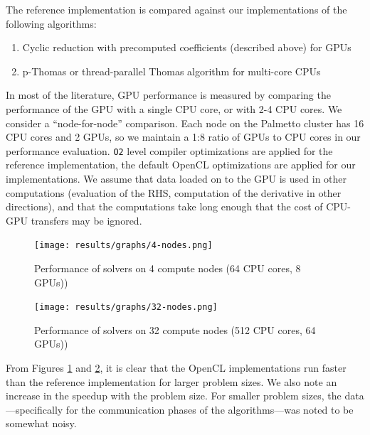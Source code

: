 \documentclass{article}
\begin{document}
    The reference implementation is compared against our implementations
    of the following algorithms:

    \begin{enumerate}
        \item Cyclic reduction with precomputed coefficients (described above)
            for GPUs
        \item p-Thomas or thread-parallel Thomas algorithm
            for multi-core CPUs
    \end{enumerate}

    In most of the literature, GPU performance is measured
    by comparing the performance of the GPU with
    a single CPU core, or with 2-4 CPU cores.
    We consider a ``node-for-node'' comparison.
    Each node on the Palmetto cluster has 16 CPU cores and 2 GPUs,
    so we maintain a 1:8 ratio of GPUs to CPU cores in our performance evaluation.
    \texttt{O2} level compiler optimizations are applied for the reference implementation,
    the default OpenCL optimizations are applied for our implementations.
    We assume that data loaded on to the GPU is used in other computations
    (evaluation of the RHS, computation of the derivative in other directions),
    and that the computations take long enough that
    the cost of CPU-GPU transfers may be ignored.

    \begin{figure}[h!]
    \begin{center}
    \texttt{[image: results/graphs/4-nodes.png]}
    \end{center}
    \caption{Performance of solvers on 4 compute nodes (64 CPU cores, 8 GPUs))}
    \label{fig:4-nodes}
    \end{figure}

    \begin{figure}[h!]
    \begin{center}
    \texttt{[image: results/graphs/32-nodes.png]}
    \end{center}
    \caption{Performance of solvers on 32 compute nodes (512 CPU cores, 64 GPUs))}
    \label{fig:32-nodes}
    \end{figure}

    From Figures \ref{fig:4-nodes} and \ref{fig:32-nodes},
    it is clear that the OpenCL implementations run faster than the reference
    implementation for larger problem sizes.
    We also note an increase in the speedup with the problem size.
    For smaller problem sizes,
    the data---specifically for the communication phases of the algorithms---was
    noted to be somewhat noisy.
\end{document}

